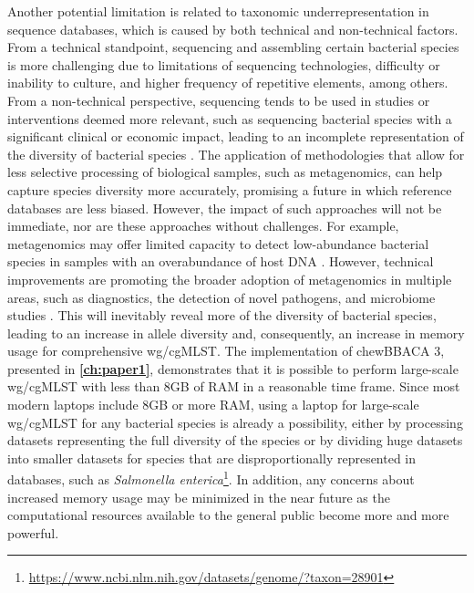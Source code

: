 Another potential limitation is related to taxonomic underrepresentation in sequence databases, which is caused by both technical and non-technical factors. From a technical standpoint, sequencing and assembling certain bacterial species is more challenging due to limitations of sequencing technologies, difficulty or inability to culture, and higher frequency of repetitive elements, among others. From a non-technical perspective, sequencing tends to be used in studies or interventions deemed more relevant, such as sequencing bacterial species with a significant clinical or economic impact, leading to an incomplete representation of the diversity of bacterial species \cite{chorlton_ten_2024}. The application of methodologies that allow for less selective processing of biological samples, such as metagenomics, can help capture species diversity more accurately, promising a future in which reference databases are less biased. However, the impact of such approaches will not be immediate, nor are these approaches without challenges. For example, metagenomics may offer limited capacity to detect low-abundance bacterial species in samples with an overabundance of host \ac{DNA} \cite{mcardle_sensitivity_2020, gao_benchmarking_2025, govender_benchmarking_2022, constantinides_hostile_2023, billington_metagenomics_2022}. However, technical improvements are promoting the broader adoption of metagenomics in multiple areas, such as diagnostics, the detection of novel pathogens, and microbiome studies \cite{buddle_evaluating_2024}. This will inevitably reveal more of the diversity of bacterial species, leading to an increase in allele diversity and, consequently, an increase in memory usage for comprehensive \ac{wg/cgMLST}. The implementation of chewBBACA 3, presented in \textbf{\autoref{ch:paper1}}, demonstrates that it is possible to perform large-scale \ac{wg/cgMLST} with less than 8GB of \ac{RAM} in a reasonable time frame. Since most modern laptops include 8GB or more \ac{RAM}, using a laptop for large-scale \ac{wg/cgMLST} for any bacterial species is already a possibility, either by processing datasets representing the full diversity of the species or by dividing huge datasets into smaller datasets for species that are disproportionally represented in databases, such as \textit{Salmonella enterica}\footnote{\url{https://www.ncbi.nlm.nih.gov/datasets/genome/?taxon=28901}}. In addition, any concerns about increased memory usage may be minimized in the near future as the computational resources available to the general public become more and more powerful.

